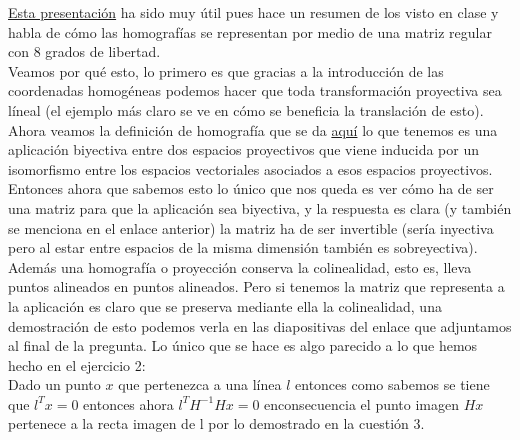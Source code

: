 \documentclass[10pt,a4paper]{article}
\begin{document}
\href{https://www.google.es/url?sa=t&rct=j&q=&esrc=s&source=web&cd=3&ved=0CDIQFjACahUKEwjT8Iud8JLJAhVEuhoKHeYgC28&url=http%3A%2F%2Fwww.educa2.madrid.org%2Fweb%2Feducamadrid%2Fprincipal%2Ffiles%2F34b0304e-7fce-4b92-875e-b0c7711e9926%2FRECURSOS%2FCURSOS%2FCIENCIAS%2FMATEMATICA%2FGEOMETRIA%2F6.2.ppt%3Ft%3D1352403629167&usg=AFQjCNFN1EfovT5vCPrslYbumh2IwsMsCA&sig2=nLFF7GxgCJLD-iM9odxlMA&bvm=bv.107467506,d.d2s&cad=rja}{Esta presentación} ha sido muy útil pues hace un resumen de los visto en clase y habla de cómo las homografías se representan por medio de una matriz regular con 8 grados de libertad.\\

Veamos por qué esto, lo primero es que gracias a la introducción de las coordenadas homogéneas podemos hacer que toda transformación proyectiva sea líneal (el ejemplo más claro se ve en cómo se beneficia la translación de esto).\\

Ahora veamos la definición de homografía que se da \href{https://en.wikipedia.org/wiki/Homography#Definition_and_expression_in_homogeneous_coordinates}{aquí} lo que tenemos es una aplicación biyectiva entre dos espacios proyectivos que viene inducida por un isomorfismo entre los espacios vectoriales asociados a esos espacios proyectivos.\\

Entonces ahora que sabemos esto lo único que nos queda es ver cómo ha de ser una matriz para que la aplicación sea biyectiva, y la respuesta es clara (y también se menciona en el enlace anterior) la matriz ha de ser invertible (sería inyectiva pero al estar entre espacios de la misma dimensión también es sobreyectiva).\\

Además una homografía o proyección conserva la colinealidad, esto es, lleva puntos alineados en puntos alineados. Pero si tenemos la matriz que representa a la aplicación es claro que se preserva mediante ella la colinealidad, una demostración de esto podemos verla en las diapositivas del enlace que adjuntamos al final de la pregunta. Lo único que se hace es algo parecido a lo que hemos hecho en el ejercicio 2:\\

Dado un punto $x$ que pertenezca a una línea $l$ entonces como sabemos se tiene que $l^{T}x=0$ entonces ahora $l^TH^{-1}Hx=0$ enconsecuencia el punto imagen $Hx$ pertenece a la recta imagen de l por lo demostrado en la cuestión 3.\\
\end{document}
